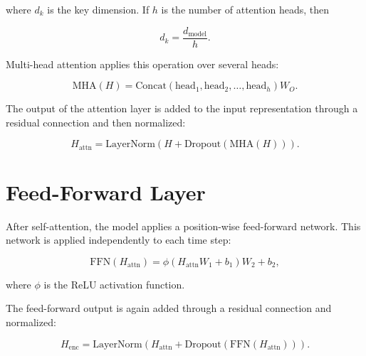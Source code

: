 \documentclass[a4paper]{article}
\begin{document}
        where \(d_k\) is the key dimension. If \(h\) is the number of attention heads, then
        
        \[
            d_k
            =
            \frac{
                d_{\mathrm{model}}
            }{
                h
            }.
        \]
        
        Multi-head attention applies this operation over several heads:
        
        \[
            \mathrm{MHA}(H)
            =
            \mathrm{Concat}
            \left(
                \mathrm{head}_1,
                \mathrm{head}_2,
                \ldots,
                \mathrm{head}_h
            \right)
            W_O.
        \]
        
        The output of the attention layer is added to the input representation through a residual connection and then normalized:
        
        \[
            H_{\mathrm{attn}}
            =
            \mathrm{LayerNorm}
            \left(
                H
                +
                \mathrm{Dropout}
                \left(
                    \mathrm{MHA}(H)
                \right)
            \right).
        \]
    
    
    \section{Feed-Forward Layer}
        
        After self-attention, the model applies a position-wise feed-forward network. This network is applied independently to each time step:
        
        \[
            \mathrm{FFN}
            \left(
                H_{\mathrm{attn}}
            \right)
            =
            \phi
            \left(
                H_{\mathrm{attn}}W_1
            +
            b_1
            \right)
            W_2
            +
            b_2,
        \]
        
        where \(\phi\) is the ReLU activation function.
        
        The feed-forward output is again added through a residual connection and normalized:
        
        \[
            H_{\mathrm{enc}}
            =
            \mathrm{LayerNorm}
            \left(
                H_{\mathrm{attn}}
                +
                \mathrm{Dropout}
                \left(
                    \mathrm{FFN}
                    \left(
                        H_{\mathrm{attn}}
                    \right)
                \right)
            \right).
        \]
        
\end{document}
